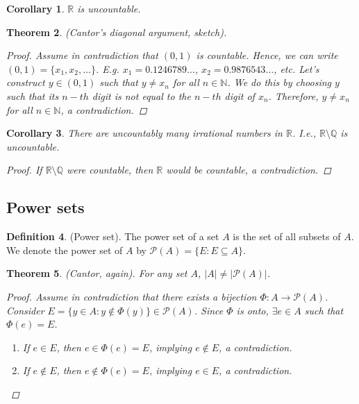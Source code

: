\documentclass[10pt]{article}
\newcommand{\N}{\mathbb{N}}
\newcommand{\R}{\mathbb{R}}
\newcommand{\Q}{\mathbb{Q}}
\newcommand{\abs}[1]{\left| #1 \right|}
\newtheorem{theorem}{Theorem}[section]
\newtheorem{corollary}[theorem]{Corollary}
\theoremstyle{definition}
\newtheorem{definition}[theorem]{Definition}
\theoremstyle{remark}
\begin{document}
\begin{corollary}
    $\R$ is uncountable.
\end{corollary}

\begin{theorem}
    (Cantor's diagonal argument, sketch).
    \begin{proof}
        Assume in contradiction that $(0, 1)$ is countable. Hence, we can write $(0, 1) = \{x_1, x_2, \ldots\}$.
        E.g. $x_1 = 0.1246789\ldots$, $x_2 = 0.9876543\ldots$, etc. Let's construct $y \in (0, 1)$ such that $y \neq x_n$ for all $n \in \N$.
        We do this by choosing $y$ such that its $n-th$ digit is not equal to the $n-th$ digit of $x_n$.
        Therefore, $y \neq x_n$ for all $n \in \N$, a contradiction.
    \end{proof}
\end{theorem}

\begin{corollary}
    There are uncountably many irrational numbers in $\R$. I.e., $\R \setminus \Q$ is uncountable.
    \begin{proof}
        If $\R \setminus \Q$ were countable, then $\R$ would be countable, a contradiction.
    \end{proof}
\end{corollary}

\subsection{Power sets}

\begin{definition}
    (Power set).
    The power set of a set $A$ is the set of all subsets of $A$.
    We denote the power set of $A$ by $\mathcal{P}(A) = \{E : E \subseteq A\}$.
\end{definition}

\begin{theorem}
    (Cantor, again).
    For any set $A$, $\abs{A} \neq \abs{\mathcal{P}(A)}$.
    \begin{proof}
        Assume in contradiction that there exists a bijection $\Phi : A \to \mathcal{P}(A)$. 
        Consider $E = \{y \in A : y \not\in \Phi(y)\} \in \mathcal{P}(A)$.
        Since $\Phi$ is onto, $\exists e \in A$ such that $\Phi(e) = E$.
        \begin{enumerate}
            \item If $e \in E$, then $e \in \Phi(e) = E$, implying $e \not\in E$, a contradiction.
            \item If $e \not\in E$, then $e \not\in \Phi(e) = E$, implying $e \in E$, a contradiction.
        \end{enumerate}
    \end{proof}
\end{theorem}
\end{document}
